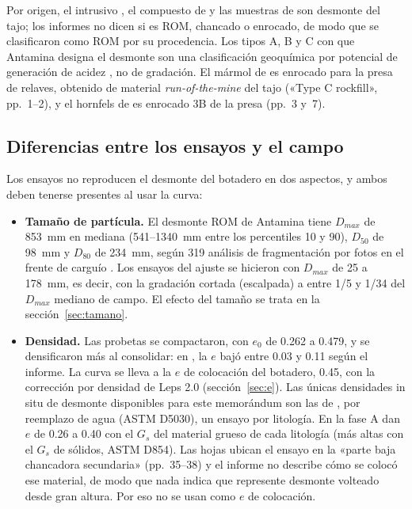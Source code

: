\documentclass[11pt,letterpaper]{article}
\begin{document}
Por origen, el intrusivo \citep{w2024,i2025}, el compuesto de \citet{g2021} y las muestras de \citet{anddes2024} son desmonte del tajo; los informes no dicen si es ROM, chancado o enrocado, de modo que se clasificaron como ROM por su procedencia. Los tipos A, B y C con que Antamina designa el desmonte son una clasificación geoquímica por potencial de generación de acidez \citep[pp.~6 y~27]{g2021}, no de gradación. El mármol de \citet{g2012} es enrocado para la presa de relaves, obtenido de material \emph{run-of-the-mine} del tajo («Type C rockfill», pp.~1--2), y el hornfels de \citet{w2022} es enrocado 3B de la presa (pp.~3 y~7).

\subsection{Diferencias entre los ensayos y el campo}
Los ensayos no reproducen el desmonte del botadero en dos aspectos, y ambos deben tenerse presentes al usar la curva:
\begin{itemize}
\item \textbf{Tamaño de partícula.} El desmonte ROM de Antamina tiene $D_{max}$ de 853~mm en mediana (541--1340~mm entre los percentiles 10 y 90), $D_{50}$ de 98~mm y $D_{80}$ de 234~mm, según 319 análisis de fragmentación por fotos en el frente de carguío \citep{antamina2025frag}. Los ensayos del ajuste se hicieron con $D_{max}$ de 25 a 178~mm, es decir, con la gradación cortada (escalpada) a entre 1/5 y 1/34 del $D_{max}$ mediano de campo. El efecto del tamaño se trata en la sección~\ref{sec:tamano}.
\item \textbf{Densidad.} Las probetas se compactaron, con $e_0$ de 0.262 a 0.479, y se densificaron más al consolidar: en \citet{g2012}, la $e$ bajó entre 0.03 y 0.11 según el informe. La curva se lleva a la $e$ de colocación del botadero, 0.45, con la corrección por densidad de Leps 2.0 (sección~\ref{sec:e}). Las únicas densidades in situ de desmonte disponibles para este memorándum son las de \citet[Tabla~2]{g2010}, por reemplazo de agua (ASTM D5030), un ensayo por litología. En la fase A dan $e$ de 0.26 a 0.40 con el $G_s$ del material grueso de cada litología (más altas con el $G_s$ de sólidos, ASTM D854). Las hojas ubican el ensayo en la «parte baja chancadora secundaria» (pp.~35--38) y el informe no describe cómo se colocó ese material, de modo que nada indica que represente desmonte volteado desde gran altura. Por eso no se usan como $e$ de colocación.
\end{itemize}
\end{document}
